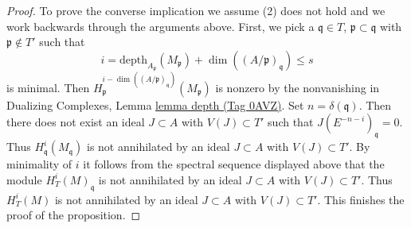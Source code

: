 \documentclass{amsart}
\theoremstyle{plain}
\theoremstyle{definition}
\theoremstyle{remark}
\numberwithin{equation}{subsection}
\begin{document}
\begin{proof}
\medskip\noindent
To prove the converse implication we assume (2) does not hold
and we work backwards through the arguments above. First, we pick a
$\mathfrak q \in T$, $\mathfrak p \subset \mathfrak q$
with $\mathfrak p \not \in T'$ such that
$$
i = \text{depth}_{A_\mathfrak p}(M_\mathfrak p) +
\dim((A/\mathfrak p)_\mathfrak q) \leq s
$$
is minimal. Then
$H^{i - \dim((A/\mathfrak p)_\mathfrak q)}_\mathfrak p(M_\mathfrak p)$
is nonzero by the nonvanishing in
Dualizing Complexes, Lemma \href{https://stacks.math.columbia.edu/tag/0AVZ}{lemma depth (Tag 0AVZ)}.
Set $n = \delta(\mathfrak q)$. Then
there does not exist an ideal $J \subset A$ with $V(J) \subset T'$
such that $J(E^{-n - i})_\mathfrak q = 0$.
Thus $H^i_\mathfrak q(M_\mathfrak q)$ is not
annihilated by an ideal $J \subset A$ with $V(J) \subset T'$.
By minimality of $i$ it follows from the spectral sequence displayed above
that the module $H^i_T(M)_\mathfrak q$
is not annihilated by an ideal $J \subset A$
with $V(J) \subset T'$. Thus $H^i_T(M)$
is not annihilated by an ideal $J \subset A$
with $V(J) \subset T'$. This finishes the proof of the proposition.
\end{proof}
\end{document}
